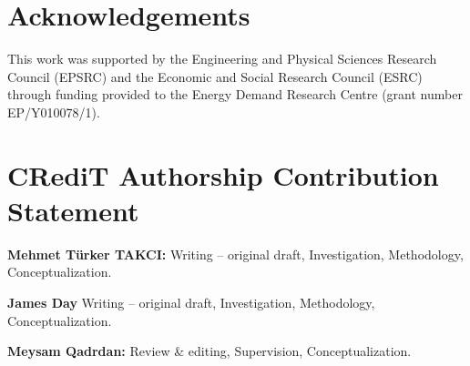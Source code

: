 \documentclass[lettersize,journal]{IEEEtran}
\begin{document}



\section*{Acknowledgements}

This work was supported by the Engineering and Physical Sciences Research Council (EPSRC) and the Economic and Social Research Council (ESRC) through funding provided to the Energy Demand Research Centre (grant number EP/Y010078/1).

\section*{CRediT Authorship Contribution Statement}

\noindent \textbf{Mehmet T\"urker TAKCI:} Writing -- original draft, Investigation, Methodology, Conceptualization.

\medskip
\noindent \textbf{James Day} Writing -- original draft, Investigation, Methodology, Conceptualization.

\medskip
\noindent \textbf{Meysam Qadrdan:} Review \& editing, Supervision, Conceptualization.
\end{document}
